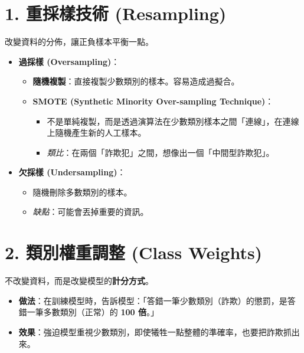 \documentclass[
  letterpaper,
  DIV=11,
  numbers=noendperiod]{scrreprt}
\providecommand{\tightlist}{%
  \setlength{\itemsep}{0pt}\setlength{\parskip}{0pt}}
\begin{document}
\section{1. 重採樣技術
(Resampling)}\label{ux91cdux63a1ux6a23ux6280ux8853-resampling}

改變資料的分佈，讓正負樣本平衡一點。

\begin{itemize}
\tightlist
\item
  \textbf{過採樣 (Oversampling)}：

  \begin{itemize}
  \tightlist
  \item
    \textbf{隨機複製}：直接複製少數類別的樣本。容易造成過擬合。
  \item
    \textbf{SMOTE (Synthetic Minority Over-sampling Technique)}：

    \begin{itemize}
    \tightlist
    \item
      不是單純複製，而是透過演算法在少數類別樣本之間「連線」，在連線上隨機產生新的人工樣本。
    \item
      \emph{類比}：在兩個「詐欺犯」之間，想像出一個「中間型詐欺犯」。
    \end{itemize}
  \end{itemize}
\item
  \textbf{欠採樣 (Undersampling)}：

  \begin{itemize}
  \tightlist
  \item
    隨機刪除多數類別的樣本。
  \item
    \emph{缺點}：可能會丟掉重要的資訊。
  \end{itemize}
\end{itemize}

\section{2. 類別權重調整 (Class
Weights)}\label{ux985eux5225ux6b0aux91cdux8abfux6574-class-weights}

不改變資料，而是改變模型的\textbf{計分方式}。

\begin{itemize}
\tightlist
\item
  \textbf{做法}：在訓練模型時，告訴模型：「答錯一筆少數類別（詐欺）的懲罰，是答錯一筆多數類別（正常）的
  \textbf{100 倍}。」
\item
  \textbf{效果}：強迫模型重視少數類別，即使犧牲一點整體的準確率，也要把詐欺抓出來。
\end{itemize}
\end{document}
